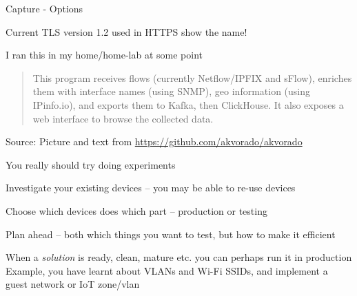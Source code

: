 \documentclass[Screen16to9,17pt]{foils}
\begin{document}


\centerline{Capture - Options}



\centerline{Current TLS version 1.2 used in HTTPS show the name!}



I ran this in my home/home-lab at some point
\begin{quote}
This program receives flows (currently Netflow/IPFIX and sFlow), enriches them with interface names (using SNMP), geo information (using IPinfo.io), and exports them to Kafka, then ClickHouse. It also exposes a web interface to browse the collected data.
\end{quote}
Source: Picture and text from \url{https://github.com/akvorado/akvorado}


\begin{list1}
\item You really should try doing experiments
\item Investigate your existing devices -- you may be able to re-use devices
\item Choose which devices does which part -- production or testing
\item Plan ahead -- both which things you want to test, but how to make it efficient
\item When a \emph{solution} is ready, clean, mature etc. you can perhaps run it in production\\
Example, you have learnt about VLANs and Wi-Fi SSIDs, and implement a guest network or IoT zone/vlan
\end{list1}


\end{document}
